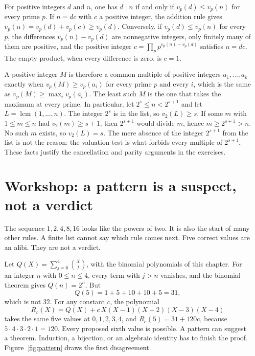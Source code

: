 For positive integers $d$ and $n$, one has $d\mid n$ if and only if $v_p(d)\le v_p(n)$ for every prime $p$. If $n=dc$ with $c$ a positive integer, the addition rule gives $v_p(n)=v_p(d)+v_p(c)\ge v_p(d)$. Conversely, if $v_p(d)\le v_p(n)$ for every $p$, the differences $v_p(n)-v_p(d)$ are nonnegative integers, only finitely many of them are positive, and the positive integer $c=\prod_p p^{v_p(n)-v_p(d)}$ satisfies $n=dc$. The empty product, when every difference is zero, is $c=1$.

A positive integer $M$ is therefore a common multiple of positive integers $a_1,\dots,a_k$ exactly when $v_p(M)\ge v_p(a_i)$ for every prime $p$ and every $i$, which is the same as $v_p(M)\ge\max_i v_p(a_i)$. The least such $M$ is the one that takes the maximum at every prime. In particular, let $2^s\le n<2^{s+1}$ and let $L=\operatorname{lcm}(1,\dots,n)$. The integer $2^s$ is in the list, so $v_2(L)\ge s$. If some $m$ with $1\le m\le n$ had $v_2(m)\ge s+1$, then $2^{s+1}$ would divide $m$, hence $m\ge 2^{s+1}>n$. No such $m$ exists, so $v_2(L)=s$. The mere absence of the integer $2^{s+1}$ from the list is not the reason: the valuation test is what forbids every multiple of $2^{s+1}$. These facts justify the cancellation and parity arguments in the exercises.

\section{Workshop: a pattern is a suspect, not a verdict}

The sequence $1,2,4,8,16$ looks like the powers of two. It is also the start of many other rules. A finite list cannot say which rule comes next. Five correct values are an alibi. They are not a verdict.

\begin{examplex}\label{ex:five-agreements}
Let $Q(X)=\sum_{j=0}^4\binom Xj$, with the binomial polynomials of this chapter. For an integer $n$ with $0\le n\le4$, every term with $j>n$ vanishes, and the binomial theorem gives $Q(n)=2^n$. But
\[
Q(5)=1+5+10+10+5=31,
\]
which is not $32$. For any constant $c$, the polynomial
\[
R_c(X)=Q(X)+c\,X(X-1)(X-2)(X-3)(X-4)
\]
takes the same five values at $0,1,2,3,4$, and $R_c(5)=31+120c$, because $5\cdot4\cdot3\cdot2\cdot1=120$. Every proposed sixth value is possible. A pattern can suggest a theorem. Induction, a bijection, or an algebraic identity has to finish the proof. Figure~\ref{fig:pattern} draws the first disagreement.
\end{examplex}


